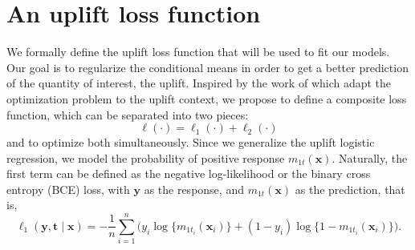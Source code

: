 \documentclass{article}
\def\tt{\mathbf t}
\def\x{\mathbf x}
\def\y{\mathbf y}
\begin{document}







\section{An uplift loss function}

We formally define the uplift loss function that will be used to fit our models. Our goal is to regularize the conditional means in order to get a better prediction of the quantity of interest, the uplift. Inspired by the work of \cite{athey2019generalized,kunzel2019metalearners,belba2019qbased,NieWager2020Quasi} which adapt the optimization problem to the uplift context, we propose to define a composite loss function, which can be separated into two pieces: $$\ell(\cdot) = \ell_1(\cdot) + \ell_2(\cdot)$$ and to optimize both simultaneously. Since we generalize the uplift logistic regression, we model the probability of positive response $m_{1t}(\x)$. Naturally, the first term can be defined as the negative log-likelihood or the binary cross entropy (BCE) loss, with $\y$ as the response, and $m_{1t}(\x)$ as the prediction, that is, $$ \ell_1(\y, \tt \mid \x) = - \frac{1}{n} \sum_{i=1}^n \Big(y_i \log\{ m_{ 1 t_i}(\x_i)\} + (1 - y_i)\log\{1 - m_{1 t_i }(\x_i)\} \Big).$$
\end{document}
